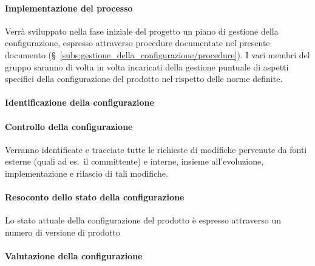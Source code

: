 \documentclass[../../norme-di-progetto.tex]{subfiles}
\begin{document}
\paragraph{Implementazione del processo}%
\label{par:implementazione_del_processo}

Verrà sviluppato nella fase iniziale del progetto un piano di gestione della configurazione, espresso attraverso procedure documentate nel presente documento (§~\ref{subs:gestione_della_configurazione/procedure}).
I vari membri del gruppo saranno di volta in volta incaricati della gestione puntuale di aspetti specifici della configurazione del prodotto nel rispetto delle norme definite.


\paragraph{Identificazione della configurazione}%
\label{par:identificazione_della_configurazione}



\paragraph{Controllo della configurazione}%
\label{par:controllo_della_configurazione}

Verranno identificate e tracciate tutte le richieste di modifiche pervenute da fonti esterne (quali ad es.\ il committente) e interne, insieme all'evoluzione, implementazione e rilascio di tali modifiche.


\paragraph{Resoconto dello stato della configurazione}%
\label{par:resoconto_dello_stato_della_configurazione}

Lo stato attuale della configurazione del prodotto è espresso attraverso un numero di versione di prodotto


\paragraph{Valutazione della configurazione}%
\label{par:valutazione_della_configurazione}
\end{document}
